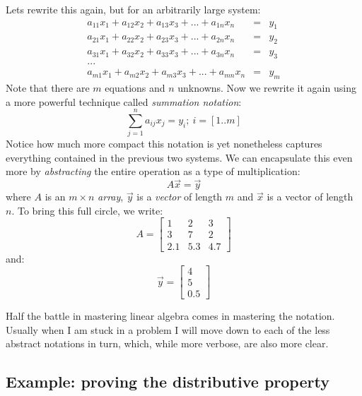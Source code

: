 \documentclass{article}
\begin{document}
Lets rewrite this again, but for an arbitrarily large system:
\begin{eqnarray}
	a_{11} x_1 + a_{12} x_2 + a_{13} x_3 + ... + a_{1n} x_n & = & y_1 \\
	a_{21} x_1 + a_{22} x_2 + a_{23} x_3 + ... + a_{2n} x_n & = & y_2 \\
	a_{31} x_1 + a_{32} x_2 + a_{33} x_3 + ... + a_{3n} x_n & = & y_3 \\ \nonumber
... \\
a_{m1} x_1 + a_{m2} x_2 + a_{m3} x_3 + ... + a_{mn} x_n & = & y_m
\end{eqnarray}
Note that there are $m$ equations and $n$ unknowns.
Now we rewrite it again using a more powerful technique called 
{\it summation notation}:
\begin{equation}
\sum_{j=1}^n a_{ij} x_j = y_i; ~ i=[1..m]
\end{equation}
Notice how much more compact this notation is yet nonetheless captures
everything contained in the previous two systems.
We can encapsulate this even more by {\it abstracting} the entire operation
as a type of multiplication:
\begin{equation}
A \vec x = \vec y
\label{matrix_vector_multiplication}
\end{equation}
where $A$ is an $m \times n$ {\it array}, $\vec y$ is a {\it vector} of length
$m$ and $\vec x$ is a vector of length $n$.
To bring this full circle, we write:
\begin{equation}
A = \left [ \begin{array}{ccc}
1 & 2 & 3 \\
3 & 7 & 2 \\
2.1 & 5.3 & 4.7
\end{array}
\right ]
\end{equation}
and:
\begin{equation}
\vec y = \left [ \begin{array}{l}
4 \\
5 \\
0.5
\end{array}
\right ]
\end{equation}

Half the battle in mastering linear algebra comes in mastering the notation.
Usually when I am stuck in a problem I will move down to each of the less
abstract notations in turn, which, while more verbose, are also more clear.

\subsection{Example: proving the distributive property}
\end{document}
